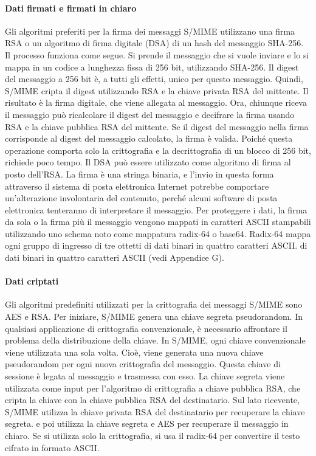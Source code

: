\paragraph{Dati firmati e firmati in chiaro} Gli algoritmi preferiti per la firma dei messaggi S/MIME utilizzano una firma RSA o un algoritmo di firma digitale (DSA) di un hash del messaggio SHA-256. Il processo funziona come segue. Si prende il messaggio che si vuole inviare e lo si mappa in un codice a lunghezza fissa di 256 bit, utilizzando SHA-256. Il digest del messaggio a 256 bit è, a tutti gli effetti, unico per questo messaggio. Quindi, S/MIME cripta il digest utilizzando RSA e la chiave privata RSA del mittente. Il risultato è la firma digitale, che viene allegata al messaggio. Ora, chiunque riceva il messaggio può ricalcolare il digest del messaggio e decifrare la firma usando RSA e la chiave pubblica RSA del mittente. Se il digest del messaggio nella firma corrisponde al digest del messaggio calcolato, la firma è valida. Poiché questa operazione comporta solo la crittografia e la decrittografia di un blocco di 256 bit, richiede poco tempo. Il DSA può essere utilizzato come algoritmo di firma al posto dell'RSA. La firma è una stringa binaria, e l'invio in questa forma attraverso il sistema di posta elettronica Internet potrebbe comportare un'alterazione involontaria del contenuto, perché alcuni software di posta elettronica tenteranno di interpretare il messaggio. Per proteggere i dati, la firma da sola o la firma più il messaggio vengono mappati in caratteri ASCII stampabili utilizzando uno schema noto come mappatura radix-64 o base64. Radix-64 mappa ogni gruppo di ingresso di tre ottetti di dati binari in quattro caratteri ASCII. di dati binari in quattro caratteri ASCII (vedi Appendice G).

\singlespacing

\paragraph{Dati criptati} Gli algoritmi predefiniti utilizzati per la crittografia dei messaggi S/MIME sono
AES e RSA. Per iniziare, S/MIME genera una chiave segreta pseudorandom. In qualsiasi applicazione di crittografia convenzionale, è necessario affrontare il problema della distribuzione della chiave. In S/MIME, ogni chiave convenzionale viene utilizzata una sola volta. Cioè, viene generata una nuova chiave pseudorandom per ogni nuova crittografia del messaggio. Questa chiave di sessione è legata al messaggio e trasmessa con esso. La chiave segreta viene utilizzata come input per l'algoritmo di crittografia a chiave pubblica RSA, che cripta la chiave con la chiave pubblica RSA del destinatario. Sul lato ricevente, S/MIME utilizza la chiave privata RSA del destinatario per recuperare la chiave segreta. e poi utilizza la chiave segreta e AES per recuperare il messaggio in chiaro. Se si utilizza solo la crittografia, si usa il radix-64 per convertire il testo cifrato in formato ASCII.

